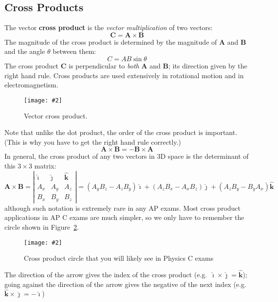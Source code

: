 \documentclass{../../../oss-handout}
\newcommand{\pic}[2]{\texttt{[image: \#2]}}
\begin{document}
\subsection{Cross Products}
The vector \textbf{cross product} is the \emph{vector multiplication} of two
vectors:
\begin{equation*}
  \bm{C}=\bm{A}\times\bm{B}
\end{equation*}
The magnitude of the cross product is determined by the magnitude of $\bm{A}$
and $\bm{B}$ and the angle $\theta$ between them:
\begin{equation*}
  C=AB\sin\theta
\end{equation*}
The cross product $\bm{C}$ is perpendicular to \emph{both} $\bm{A}$ and
$\bm{B}$; its direction given by the right hand rule. Cross products are used
extensively in rotational motion and in electromagnetism.
\begin{figure}[ht]
  \centering
  \pic{.3}{cross-product.png}
  \caption{Vector cross product.}
  \label{fig:cross1}
\end{figure}
Note that unlike the dot product, the order of the cross product is important.
(This is why you have to get the right hand rule correctly.)
\begin{equation*}
  \bm{A}\times\bm{B}=-\bm{B}\times\bm{A}
\end{equation*}
In general, the cross product of any two vectors in 3D space is the determinant
of this $3\times 3$ matrix:
\begin{equation*}
  \bm{A}\times\bm{B}=
  \left|
  \begin{matrix}
    \bm{\hat{\imath}} & \bm{\hat{\jmath}} & \bm{\hat{k}}\\
    A_x & A_y & A_z\\
    B_x & B_y & B_z
  \end{matrix}
  \right|
  =(A_yB_z-A_zB_y)\bm{\hat{\imath}} +
  (A_zB_x-A_xB_z)\bm{\hat{\jmath}} +
  (A_zB_y-B_yA_x)\bm{\hat{k}}
\end{equation*}
although such notation is extremely rare in any AP exams. Most cross product
applications in AP C exams are much simpler, so we
only have to remember the circle shown in Figure~\ref{fig:cross2}.
\begin{figure}[ht]
  \centering
  \pic{.12}{cross-product-circle.png}
  \caption{Cross product circle that you will likely see in Physics C exams}
  \label{fig:cross2}
\end{figure}

The direction of the arrow gives the index of the cross product (e.g.\
$\bm{\hat{\imath}}\times\bm{\hat{\jmath}}=\bm{\hat{k}}$); going against the
direction of the arrow gives the negative of the next index (e.g.\
$\bm{\hat{k}}\times\bm{\hat{\jmath}}=-\bm{\hat{\imath}}$)
\end{document}
